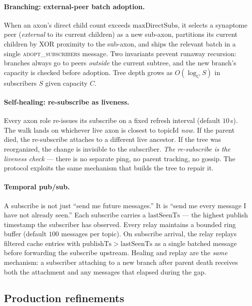 \documentclass[conference]{IEEEtran}
\begin{document}
\paragraph{Branching: external-peer batch adoption.}
When an axon's direct child count exceeds $\mathrm{maxDirectSubs}$, it
selects a synaptome peer (\emph{external} to its current children) as a
new sub-axon, partitions its current children by XOR proximity to the
sub-axon, and ships the relevant batch in a single
\textsc{adopt\_subscribers} message. Two invariants prevent runaway
recursion: branches always go to peers \emph{outside} the current
subtree, and the new branch's capacity is checked before adoption. Tree
depth grows as $O(\log_{C} S)$ in subscribers $S$ given capacity $C$.

\paragraph{Self-healing: re-subscribe as liveness.}
Every axon role re-issues its subscribe on a fixed refresh interval
(default $10$\,s). The walk lands on whichever live axon is closest to
$\mathrm{topicId}$ \emph{now}. If the parent died, the re-subscribe
attaches to a different live ancestor. If the tree was reorganized,
the change is invisible to the subscriber. \emph{The re-subscribe is
the liveness check} --- there is no separate ping, no parent tracking,
no gossip. The protocol exploits the same mechanism that builds the
tree to repair it.

\paragraph{Temporal pub/sub.}
A subscribe is not just ``send me future messages.'' It is ``send me
every message I have not already seen.'' Each subscribe carries a
$\mathrm{lastSeenTs}$ --- the highest publish timestamp the subscriber
has observed. Every relay maintains a bounded ring buffer (default
$100$ messages per topic). On subscribe arrival, the relay replays
filtered cache entries with $\mathrm{publishTs} > \mathrm{lastSeenTs}$
as a single batched message before forwarding the subscribe upstream.
Healing and replay are the \emph{same} mechanism: a subscriber
attaching to a new branch after parent death receives both the
attachment and any messages that elapsed during the gap.

\subsection{Production refinements}
\label{sec:pubsub-production}
\end{document}
